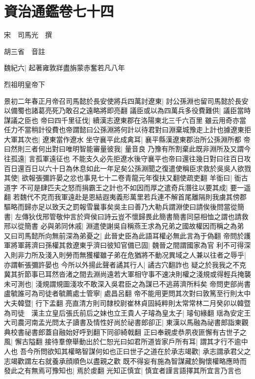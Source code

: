 \chapter{資治通鑑卷七十四}
宋　司馬光　撰

胡三省　音註

魏紀六|{
	起著雍敦牂盡旃蒙赤奮若凡八年}


烈祖明皇帝下

景初二年春正月帝召司馬懿於長安使將兵四萬討遼東|{
	討公孫淵也留司馬懿於長安以備蜀也諸葛亮死乃敢召之遠略將即亮翻}
議臣或以為四萬兵多役費難供|{
	議臣當時謀議之臣也}
帝曰四千里征伐|{
	續漢志遼東郡在洛陽東北三千六百里}
雖云用奇亦當任力不當稍計役費也帝謂懿曰公孫淵將何計以待君對曰淵棄城豫走上計也據遼東拒大軍其次也|{
	遼東當作遼水}
坐守襄平此成禽耳|{
	襄平縣漢遼東郡治所公孫淵所都}
帝曰然則三者何出對曰唯明智能審量彼我|{
	量音良}
乃豫有所割棄此既非淵所及又謂今往孤遠|{
	言孤軍遠征也}
不能支久必先拒遼水後守襄平也帝曰還往幾日對曰往百日攻百日還百日以六十日為休息如此一年足矣公孫淵聞之復遣使稱臣求救於吳吳人欲戮其使|{
	欲報張彌許晏之忿也事見七十二卷青龍元年復扶又翻使疏吏翻}
羊衜曰|{
	衜古道字}
不可是肆匹夫之怒而捐霸王之計也不如因而厚之遣奇兵潛往以要其成|{
	要一遥翻}
若魏代不克而我軍遠赴是恩結遐夷義形萬里若兵連不解首尾離隔則我虜其傍郡驅略而歸亦足以致天之罰報雪曩事矣吳主曰善乃大勒兵謂淵使曰請俟後問當從簡書|{
	左傳狄伐邢管敬仲言於齊侯曰詩云豈不懷歸畏此簡書簡書同惡相恤之謂也請救邢以從簡書}
必與弟同休戚|{
	淵遣使謝吳自稱燕王求為兄弟之國故權因而稱之為弟}
又曰司馬懿所向無前深為弟憂之|{
	此晉史臣為此語耳權必無此言為于偽翻}
帝問於護軍將軍蔣濟曰孫權其救遼東乎濟曰彼知官備已固|{
	魏晉之間謂國家為官}
利不可得深入則非力所及淺入則勞而無獲權雖子弟在危猶將不動况異域之人兼以往者之辱乎|{
	亦謂斬張彌許晏也}
今所以外揚此聲者譎其行人|{
	譎古穴翻詐也}
疑之於我我之不克冀其折節事已耳然沓渚之間去淵尚遠若大軍相守事不速决則權之淺規或得輕兵掩襲未可測也|{
	淺規謂規圖淺攻不敢深入吳君臣之為謀已不逃蔣濟所料矣}
帝問吏部尚書盧毓誰可為司徒者毓薦處士管寧|{
	處昌呂翻}
帝不能用更問其次對曰敦篤至行則太中大夫韓暨|{
	行下孟翻}
亮直清方則司隸校尉崔林貞固純粹則太常常林二月癸卯以韓暨為司徒　漢主立皇后張氏前后之妹也立王貴人子璿為皇太子|{
	璿旬緣翻}
瑶為安定王大司農河南孟光問太子讀書及情性好尚於祕書郎卻正|{
	東漢以馬融為祕書郎詣東觀典校書祕書郎蓋自融始好呼到翻下同卻綺戟翻}
正曰奉親䖍恭夙夜匪懈有古世子之風|{
	懈古隘翻}
接待羣僚舉動出於仁恕光曰如君所道皆家戶所有耳|{
	謂其才行不逾中人也}
吾今所問欲知其權略智謀何如也正曰世子之道在於承志竭歡|{
	承志謂承君父之志竭歡謂左右就養承顔順色以盡親之歡}
既不得妄有施為智謀藏於胸懷權略應時而發此之有無焉可豫知也|{
	焉於䖍翻}
光知正慎宜|{
	慎宜者謹言語擇其所宜言乃言也}
